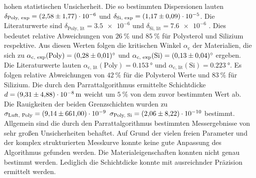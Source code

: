 hohen statistischen Unsicherheit.
Die so bestimmten Dispersionen lauten  $\delta_\text{Poly, exp} = \num{2.58 +- 1.77e-6}$ und $\delta_\text{Si, exp} = \num{1.17 +- 0.09e-5}$. Die Literaturwerte sind
$\delta_\text{Poly, lit} = \num{3.5e-6}$ und $\delta_\text{Si, lit} = \num{7.6e-6}$ \cite{V44}. Dies bedeutet relative Abweichungen von $\qty{26}{\percent}$ und 
$\qty{85}{\percent}$ für Polysterol und Silizium respektive. Aus diesen Werten folgen die kritischen Winkel $\alpha_\text{c}$ der Materialien, die sich zu 
$\alpha_\text{c, exp}(\text{Poly}) =\qty{0.28 +- 0.01}{\degree}$ und $\alpha_\text{c, exp}(\text{Si}) = \qty{0.13 +- 0.04}{\degree}$ ergeben. Die Literaturwerte lauten 
$\alpha_\text{c, lit}(\text{Poly}) =\qty{0.153}{\degree}$ und $\alpha_\text{c, lit}(\text{Si}) =\qty{0.223}{\degree}$. Es folgen relative Abweichungen von $\qty{42}{\percent}$
für die Polysterol Werte und  $\qty{83}{\percent}$ für Silizium. Die durch den Parrattalgorithmus ermittelte Schichtdicke $d = \qty{9.31 +- 4.88e-8}{\metre}$ weicht um 
$\qty{5}{\percent}$ von dem zuvor bestimmten Wert ab. 
Die Rauigkeiten der beiden Grenzschichten wurden zu $\sigma_\text{Luft, Poly} = \num{9.14 +- 661e-9}$ $\sigma_\text{Poly, Si} = \num{2.06 +- 8.22e-10}$ bestimmt. \\
Allgemein sind die durch den Parrattalgorithmus bestimmten Messergebnisse von sehr großen Unsicherheiten behaftet.
Auf Grund der vielen freien Parameter und der komplex strukturierten Messkurve konnte keine gute Anpassung des Algorithmus gefunden werden.
Die Materialeigenschaften konnten nicht genau bestimmt werden. Lediglich die Schichtdicke konnte mit ausreichnder Präzision ermittelt werden. 
